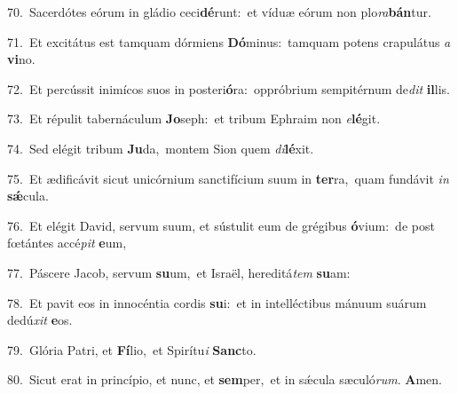 {\numbfont\textcolor{\numbcolor}{70.}}~Sacerdótes eórum in gládio ceci\-\textbf{dé}\-runt:~\star et víduæ eórum non plo\-\textit{ra}\-\textbf{bán}tur.\par
{\numbfont\textcolor{\numbcolor}{71.}}~Et excitátus est tamquam dórmiens \textbf{Dó}\-minus:~\star tamquam potens crapulátus \textit{a} \textbf{vi}\-no.\par
{\numbfont\textcolor{\numbcolor}{72.}}~Et percússit inimícos suos in posteri\-\textbf{ó}\-ra:~\star oppróbrium sempitérnum de\textit{dit} \textbf{il}\-lis.\par
{\numbfont\textcolor{\numbcolor}{73.}}~Et répulit tabernáculum \textbf{Jo}\-seph:~\star et tribum Ephraim non \textit{e}\-\textbf{lé}git.\par
{\numbfont\textcolor{\numbcolor}{74.}}~Sed elégit tribum \textbf{Ju}\-da,~\star montem Sion quem \textit{di}\-\textbf{lé}xit.\par
{\numbfont\textcolor{\numbcolor}{75.}}~Et ædificávit sicut unicórnium sanctifícium suum in \textbf{ter}\-ra,~\star quam fundávit \textit{in} \textbf{sǽ}\-cula.\par
{\numbfont\textcolor{\numbcolor}{76.}}~Et elégit David, servum suum, et sústulit eum de grégibus \textbf{ó}\-vium:~\star de post fœtántes accé\textit{pit} \textbf{e}\-um,\par
{\numbfont\textcolor{\numbcolor}{77.}}~Páscere Jacob, servum \textbf{su}\-um,~\star et Israël, hereditá\textit{tem} \textbf{su}\-am:\par
{\numbfont\textcolor{\numbcolor}{78.}}~Et pavit eos in innocéntia cordis \textbf{su}\-i:~\star et in intelléctibus mánuum suárum dedú\textit{xit} \textbf{e}\-os.\par
{\numbfont\textcolor{\numbcolor}{79.}}~Glória Patri, et \textbf{Fí}\-lio,~\star et Spirítu\textit{i} \textbf{Sanc}\-to.\par
{\numbfont\textcolor{\numbcolor}{80.}}~Sicut erat in princípio, et nunc, et \textbf{sem}\-per,~\star et in sǽcula sæculó\-\textit{rum}\-. \textbf{A}\-men.\par
